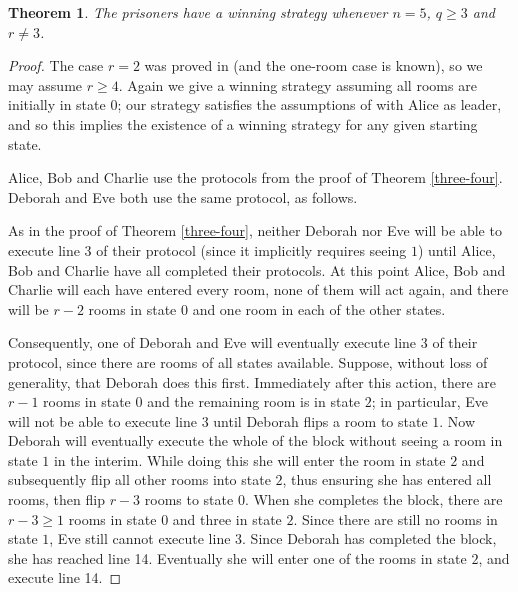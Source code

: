 \documentclass[a4paper,11pt]{extarticle}
\newtheorem{theorem}{Theorem}
\theoremstyle{definition}
\theoremstyle{remark}
\begin{document}
	\begin{theorem}\label{three-five}The prisoners have a winning strategy whenever $n=5$, $q\geq 3$ and $r\neq 3$.
	\end{theorem}
	\begin{proof}
		The case $r=2$ was proved in \cite{KK21} (and the one-room case is known), so we may assume $r\geq 4$. Again we give a winning strategy assuming all rooms are initially in state $0$; our strategy satisfies the assumptions of \cite[Lemma 4]{KK21} with Alice as leader, and so this implies the existence of a winning strategy for any given starting state.
		
		Alice, Bob and Charlie use the protocols from the proof of Theorem \ref{three-four}. Deborah and Eve both use the same protocol, as follows.
		
		\begin{algorithm}[H]
			\caption{Deborah and Eve's Protocol}
			\;
			\;
			\;
			\;
		\end{algorithm}
		
		As in the proof of Theorem \ref{three-four}, neither Deborah nor Eve will be able to execute line 3 of their protocol (since it implicitly requires seeing $1$) until Alice, Bob and Charlie have all completed their protocols. At this point Alice, Bob and Charlie will each have entered every room, none of them will act again, and there will be $r-2$ rooms in state $0$ and one room in each of the other states. 
		
		Consequently, one of Deborah and Eve will eventually execute line 3 of their protocol, since there are rooms of all states available. Suppose, without loss of generality, that Deborah does this first. Immediately after this action, there are $r-1$ rooms in state $0$ and the remaining room is in state $2$; in particular, Eve will not be able to execute line 3 until Deborah flips a room to state $1$. Now Deborah will eventually execute the whole of the \wotext block without seeing a room in state $1$ in the interim. While doing this she will enter the room in state $2$ and subsequently flip all other rooms into state $2$, thus ensuring she has entered all rooms, then flip $r-3$ rooms to state $0$. When she completes the \wotext block, there are $r-3\geq 1$ rooms in state $0$ and three in state $2$. Since there are still no rooms in state $1$, Eve still cannot execute line 3. Since Deborah has completed the \wotext block, she has reached line 14. Eventually she will enter one of the rooms in state $2$, and execute line 14.
		

\end{proof}
\end{document}
